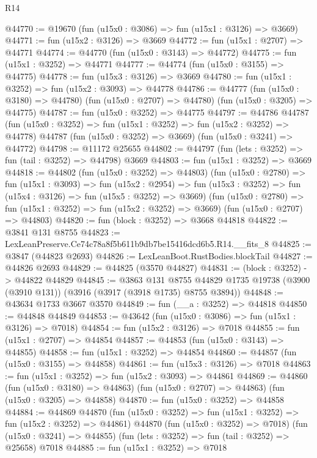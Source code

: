 \begin{lexlean}{R14}
\begin{coremodule}
@44770 := @19670 (fun (u15x0 : @3086) => fun (u15x1 : @3126) => @3669)
@44771 := fun (u15x2 : @3126) => @3669
@44772 := fun (u15x1 : @2707) => @44771
@44774 := @44770 (fun (u15x0 : @3143) => @44772)
@44775 := fun (u15x1 : @3252) => @44771
@44777 := @44774 (fun (u15x0 : @3155) => @44775)
@44778 := fun (u15x3 : @3126) => @3669
@44780 := fun (u15x1 : @3252) => fun (u15x2 : @3093) => @44778
@44786 := @44777
    (fun (u15x0 : @3180) => @44780)
    (fun (u15x0 : @2707) => @44780)
    (fun (u15x0 : @3205) => @44775)
@44787 := fun (u15x0 : @3252) => @44775
@44797 := @44786
    @44787
    (fun (u15x0 : @3252) => fun (u15x1 : @3252) => fun (u15x2 : @3252) => @44778)
    @44787
    (fun (u15x0 : @3252) => @3669)
    (fun (u15x0 : @3241) => @44772)
@44798 := @11172 @25655
@44802 := @44797 (fun (lets : @3252) => fun (tail : @3252) => @44798) @3669
@44803 := fun (u15x1 : @3252) => @3669
@44818 := @44802
    (fun (u15x0 : @3252) => @44803)
    (fun (u15x0 : @2780) =>
    fun (u15x1 : @3093) =>
    fun (u15x2 : @2954) =>
    fun (u15x3 : @3252) => fun (u15x4 : @3126) => fun (u15x5 : @3252) => @3669)
    (fun (u15x0 : @2780) => fun (u15x1 : @3252) => fun (u15x2 : @3252) => @3669)
    (fun (u15x0 : @2707) => @44803)
@44820 := fun (block : @3252) => @3668 @44818
@44822 := @3841 @131 @8755
@44823 := LexLeanPreserve.Ce74c78a8f5b611b9db7be15416dcd6b5.R14.__fits_8
@44825 := @3847 (@44823 @2693)
@44826 := LexLeanBoot.RustBodies.blockTail
@44827 := @44826 @2693
@44829 := @44825 (@3570 @44827)
@44831 := (block : @3252) -> @44822 @44829
@44845 := @3863
    @131
    @8755
    @44829
    @1735
    @19738
    (@3900 (@3910 @131))
    (@3916 (@3917 (@3918 @1735) @8755 @3894))
@44848 := @43634 @1733 @3667 @3570
@44849 := fun (__a : @3252) => @44818
@44850 := @44848 @44849
@44853 := @43642 (fun (u15x0 : @3086) => fun (u15x1 : @3126) => @7018)
@44854 := fun (u15x2 : @3126) => @7018
@44855 := fun (u15x1 : @2707) => @44854
@44857 := @44853 (fun (u15x0 : @3143) => @44855)
@44858 := fun (u15x1 : @3252) => @44854
@44860 := @44857 (fun (u15x0 : @3155) => @44858)
@44861 := fun (u15x3 : @3126) => @7018
@44863 := fun (u15x1 : @3252) => fun (u15x2 : @3093) => @44861
@44869 := @44860
    (fun (u15x0 : @3180) => @44863)
    (fun (u15x0 : @2707) => @44863)
    (fun (u15x0 : @3205) => @44858)
@44870 := fun (u15x0 : @3252) => @44858
@44884 := @44869
    @44870
    (fun (u15x0 : @3252) => fun (u15x1 : @3252) => fun (u15x2 : @3252) => @44861)
    @44870
    (fun (u15x0 : @3252) => @7018)
    (fun (u15x0 : @3241) => @44855)
    (fun (lets : @3252) => fun (tail : @3252) => @25658)
    @7018
@44885 := fun (u15x1 : @3252) => @7018

\end{coremodule}
\end{lexlean}
